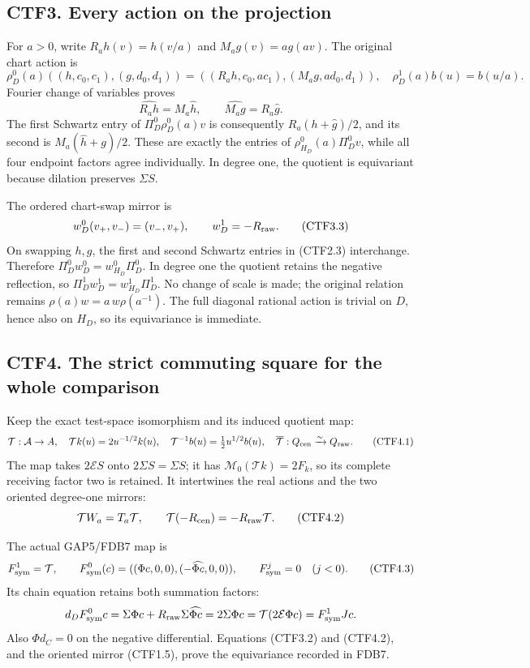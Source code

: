 \subsection{CTF3. Every action on the
projection}\label{ctf3.-every-action-on-the-projection}

For \(a>0\), write \(R_ah(v)=h(v/a)\) and \(M_ag(v)=a g(av)\). The
original chart action is \[
\rho_D^0(a)((h,c_0,c_1),(g,d_0,d_1))
=((R_ah,c_0,ac_1),(M_ag,ad_0,d_1)),
\quad \rho_D^1(a)b(u)=b(u/a).
\tag{CTF3.1}
\] Fourier change of variables proves \[
\widehat{R_ah}=M_a\widehat h,\qquad
\widehat{M_ag}=R_a\widehat g.
\tag{CTF3.2}
\] The first Schwartz entry of \(\Pi_D^0\rho_D^0(a)v\) is consequently
\(R_a(h+\widehat g)/2\), and its second is \(M_a(\widehat h+g)/2\).
These are exactly the entries of \(\rho_{H_D}^0(a)\Pi_D^0v\), while all
four endpoint factors agree individually. In degree one, the quotient is
equivariant because dilation preserves \(\Sigma S\).

The ordered chart-swap mirror is \[
w_D^0(v_+,v_-)=(v_-,v_+),\qquad
w_D^1=-R_{\rm raw}.
\tag{CTF3.3}
\] On swapping \(h,g\), the first and second Schwartz entries in
(CTF2.3) interchange. Therefore \(\Pi_D^0w_D^0=w_{H_D}^0\Pi_D^0\). In
degree one the quotient retains the negative reflection, so
\(\Pi_D^1w_D^1=w_{H_D}^1\Pi_D^1\). No change of scale is made; the
original relation remains \(\rho(a)w=a\,w\rho(a^{-1})\). The full
diagonal rational action is trivial on \(D\), hence also on \(H_D\), so
its equivariance is immediate.

\subsection{CTF4. The strict commuting square for the whole
comparison}\label{ctf4.-the-strict-commuting-square-for-the-whole-comparison}

Keep the exact test-space isomorphism and its induced quotient map: \[
\mathcal T:\mathcal A\to A,\quad
\mathcal Tk(u)=2u^{-1/2}k(u),\quad
\mathcal T^{-1}b(u)=\tfrac12u^{1/2}b(u),\quad
\overline{\mathcal T}:Q_{\rm cen}\xrightarrow{\sim}Q_{\rm raw}.
\tag{CTF4.1}
\] The map takes \(2\mathcal ES\) onto \(2\Sigma S=\Sigma S\); it has
\(\mathcal M_0(\mathcal Tk)=2F_k\), so its complete receiving factor two
is retained. It intertwines the real actions and the two oriented
degree-one mirrors: \[
\mathcal TW_a=T_a\mathcal T,\qquad
\mathcal T(-R_{\rm cen})=-R_{\rm raw}\mathcal T.
\tag{CTF4.2}
\]

The actual GAP5/FDB7 map is \[
F_{\rm sym}^1=\mathcal T,\qquad
F_{\rm sym}^0(c)=((\Phi c,0,0),(-\widehat{\Phi c},0,0)),
\qquad F_{\rm sym}^j=0\quad(j<0).
\tag{CTF4.3}
\] Its chain equation retains both summation factors: \[
d_DF_{\rm sym}^0c
=\Sigma\Phi c+R_{\rm raw}\Sigma\widehat{\Phi c}
=2\Sigma\Phi c
=\mathcal T(2\mathcal E\Phi c)=F_{\rm sym}^1Jc.
\] Also \(\Phi d_C=0\) on the negative differential. Equations (CTF3.2)
and (CTF4.2), and the oriented mirror (CTF1.5), prove the equivariance
recorded in FDB7.

